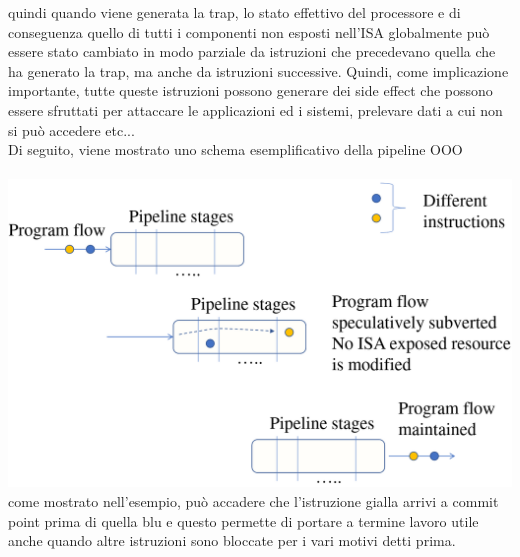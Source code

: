 \documentclass[12pt, oneside]{extbook}
\begin{document}
quindi quando viene generata la trap, lo stato effettivo del processore e di conseguenza quello di tutti i componenti non esposti nell'ISA globalmente può essere stato cambiato in modo parziale da istruzioni che precedevano quella che ha generato la trap, ma anche da istruzioni successive. Quindi, come implicazione importante, tutte queste istruzioni possono generare dei side effect che possono essere sfruttati per attaccare le applicazioni ed i sistemi, prelevare dati a cui non si può accedere etc...\\ Di seguito, viene mostrato uno schema esemplificativo della pipeline OOO\\\\
\includegraphics[scale=0.2]{immagini/pipeline-ooo}\\
come mostrato nell'esempio, può accadere che l'istruzione gialla arrivi a commit point prima  di quella blu e questo permette di portare a termine lavoro utile anche quando altre istruzioni sono bloccate per i vari motivi detti prima.
\end{document}
